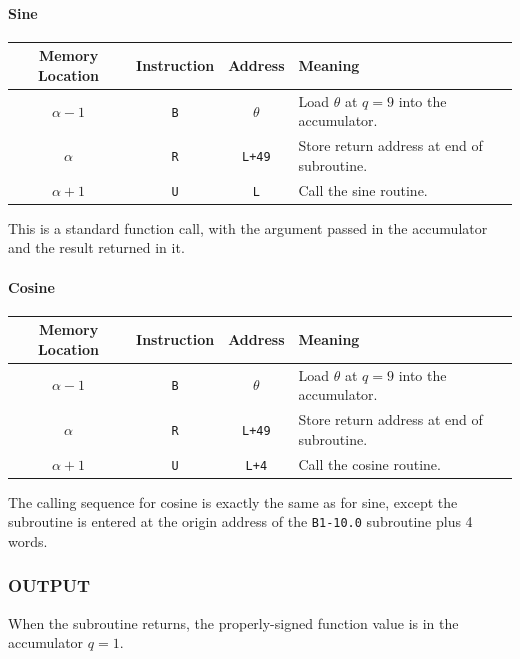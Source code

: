 \paragraph{Sine}
\begin{table}[h!]
\centering
\begin{tabularx}{\textwidth}{cccX}
\toprule
\textbf{Memory Location} & \textbf{Instruction} & \textbf{Address} & \textbf{Meaning} \\
\midrule
$\alpha-1$      & \texttt{B}            & $\theta$       & Load $\theta$ at $q=9$ into the accumulator.\\
$\alpha$      & \texttt{R}            & \texttt{L+49}    & Store return address at end of subroutine.\\
$\alpha+1$      & \texttt{U}            & \texttt{L}       & Call the sine routine.\\
\bottomrule
\end{tabularx}
\end{table}


This is a standard function call, with the argument passed in the accumulator and the result returned in it.

\paragraph{Cosine}
\begin{table}[h!]
\centering
\begin{tabularx}{\textwidth}{cccX}
\toprule
\textbf{Memory Location} & \textbf{Instruction} & \textbf{Address} & \textbf{Meaning} \\
\midrule
$\alpha-1$      & \texttt{B}            & $\theta$       & Load $\theta$ at $q=9$ into the accumulator.\\
$\alpha$      & \texttt{R}            & \texttt{L+49}    & Store return address at end of subroutine.\\
$\alpha+1$      & \texttt{U}            & \texttt{L+4}       & Call the cosine routine.\\
\bottomrule
\end{tabularx}
\end{table}

The calling sequence for cosine is exactly the same as for sine, except the subroutine is entered at the origin address of the \texttt{B1-10.0} subroutine plus 4 words.

\subsubsection*{OUTPUT}
When the subroutine returns, the properly-signed function value is in the accumulator $q=1$.

